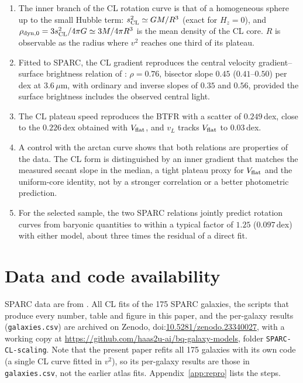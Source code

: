 \documentclass[11pt,a4paper]{article}
\newcommand{\codeDOI}{\href{https://doi.org/10.5281/zenodo.23340027}{10.5281/zenodo.23340027}}
\newcommand{\vL}{v_{\!L}}
\newcommand{\sCL}{s_{\rm CL}}
\newcommand{\Vf}{V_{\rm flat}}
\begin{document}
\begin{enumerate}
\item The inner branch of the CL rotation curve is that of a homogeneous sphere up to the small Hubble term: $\sCL^2\simeq GM/R^3$ (exact for $H_z=0$), and $\rho_{\rm dyn,0}=3\sCL^2/4\pi G\simeq3M/4\pi R^3$ is the mean density of the CL core. $R$ is observable as the radius where $v^2$ reaches one third of its plateau.
\item Fitted to SPARC, the CL gradient reproduces the central velocity gradient--surface brightness relation of \citet{Lelli2013}: $\rho=0.76$, bisector slope $0.45$ ($0.41$--$0.50$) per dex at 3.6\,$\mu$m, with ordinary and inverse slopes of $0.35$ and $0.56$, provided the surface brightness includes the observed central light.
\item The CL plateau speed reproduces the BTFR with a scatter of $0.249$\,dex, close to the $0.226$\,dex obtained with $\Vf$, and $\vL$ tracks $\Vf$ to $0.03$\,dex.
\item A control with the arctan curve shows that both relations are properties of the data. The CL form is distinguished by an inner gradient that matches the measured secant slope in the median, a tight plateau proxy for $\Vf$ and the uniform-core identity, not by a stronger correlation or a better photometric prediction.
\item For the selected sample, the two SPARC relations jointly predict rotation curves from baryonic quantities to within a typical factor of $1.25$ ($0.097$\,dex) with either model, about three times the residual of a direct fit.
\end{enumerate}

\section*{Data and code availability}
SPARC data are from \citet{Lelli2016sparc}. All CL fits of the 175 SPARC galaxies, the scripts that produce every number, table and figure in this paper, and the per-galaxy results (\texttt{galaxies.csv}) are archived on Zenodo, doi:\codeDOI, with a working copy at \url{https://github.com/haas2u-ai/bq-galaxy-models}, folder \texttt{SPARC-CL-scaling}. Note that the present paper refits all 175 galaxies with its own code (a single CL curve fitted in $v^2$), so its per-galaxy results are those in \texttt{galaxies.csv}, not the earlier atlas fits. Appendix~\ref{app:repro} lists the steps.

\appendix
\end{document}
